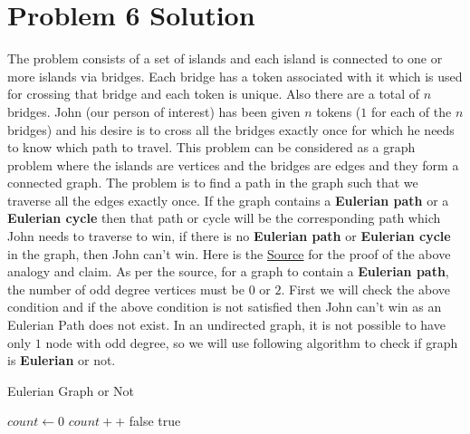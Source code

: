 \documentclass{article}
\let\bold\textbf
\begin{document}
\section{Problem 6 Solution}{
  The problem consists of a set of islands and each island is connected to one or more islands via bridges. 
  \newline Each bridge has a token associated with it which is used for crossing that bridge and each token is unique. Also there are a total of $n$ bridges.
  \newline John (our person of interest) has been given $n$ tokens ($1$ for each of the $n$ bridges) and his desire is to cross all the bridges exactly once for which he needs to know which path to travel.
  \newline \newline This problem can be considered as a graph problem where the islands are vertices and the bridges are edges and they form a connected graph.
  \newline The problem is to find a path in the graph such that we traverse all the edges exactly once.
  \newline If the graph contains a \bold{Eulerian path} or a \bold{Eulerian cycle} then that path or cycle will be the corresponding path which John needs to traverse to win, if there is no \bold{Eulerian path} or \bold{Eulerian cycle} in the graph, then John can't win.
  \newline Here is the \href{https://en.wikipedia.org/wiki/Eulerian\_path}{Source} for the proof of the above analogy and claim.
  \newline \newline As per the source, for a graph to contain a \bold{Eulerian path}, the number of odd degree vertices must be $0$ or $2$.
  \newline First we will check the above condition and if the above condition is not satisfied then John can't win as an Eulerian Path does not exist.
  \newline In an undirected graph, it is not possible to have only $1$ node with odd degree, so we will use following algorithm to check if graph is \bold{Eulerian} or not. \newline

  \begin{algorithm}
    \caption{Eulerian Graph or Not}\label{eulerian}
    \begin{algorithmic}[1]
        \State $count \gets 0$
            \State $count++$
          \EndIf
        \EndFor
          \State \Return false
        \EndIf
        \State \Return true
     \EndProcedure
    \end{algorithmic}
  \end{algorithm}

}
\end{document}
